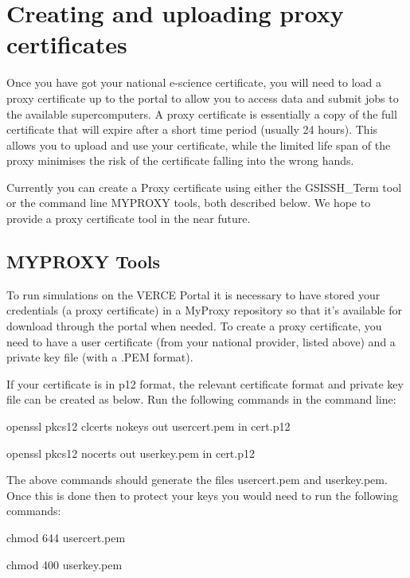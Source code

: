 \documentclass[english]{book}
\begin{document}
\section{Creating and uploading proxy certificates}
\label{\detokenize{Section3:creating-and-uploading-proxy-certificates}}
Once you have got your national e-science certificate, you will need to
load a proxy certificate up to the portal to allow you to access data
and submit jobs to the available supercomputers. A proxy certificate is
essentially a copy of the full certificate that will expire after a
short time period (usually 24 hours). This allows you to upload and use
your certificate, while the limited life span of the proxy minimises the
risk of the certificate falling into the wrong hands.

Currently you can create a Proxy certificate using either the
GSISSH\_Term tool or the command line MYPROXY tools, both described
below. We hope to provide a proxy certificate tool in the near future.


\subsection{MYPROXY Tools}
\label{\detokenize{Section3:myproxy-tools}}
To run simulations on the VERCE Portal it is necessary to have stored
your credentials (a proxy certificate) in a MyProxy repository so that
it’s available for download through the portal when needed. To create a
proxy certificate, you need to have a user certificate (from your
national provider, listed above) and a private key file (with a .PEM
format).

If your certificate is in p12 format, the relevant certificate format
and private key file can be created as below. Run the following commands
in the command line:

%
\begin{sphinxVerbatim}[commandchars=\\\{\}]
openssl pkcs12 \PYGZhy{}clcerts \PYGZhy{}nokeys \PYGZhy{}out usercert.pem \PYGZhy{}in cert.p12

openssl pkcs12 \PYGZhy{}nocerts \PYGZhy{}out userkey.pem \PYGZhy{}in cert.p12
\end{sphinxVerbatim}

The above commands should generate the files usercert.pem and
userkey.pem. Once this is done then to protect your keys you would need
to run the following commands:

%
\begin{sphinxVerbatim}[commandchars=\\\{\}]
chmod 644 usercert.pem

chmod 400 userkey.pem
\end{sphinxVerbatim}
\end{document}
